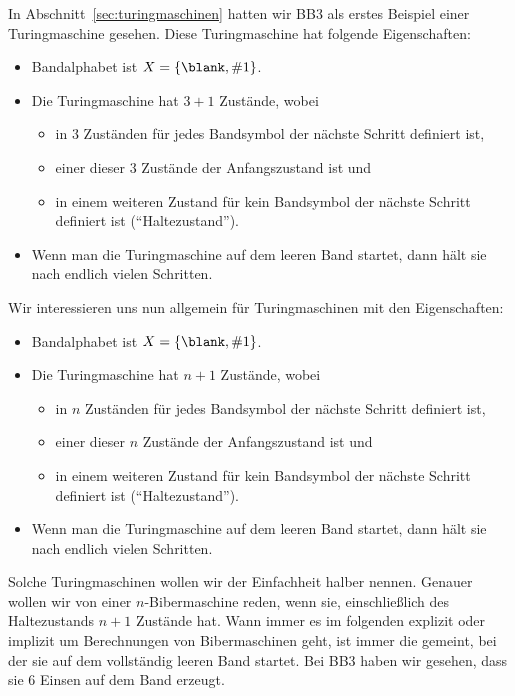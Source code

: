 In Abschnitt~\ref{sec:turingmaschinen} hatten wir BB3 als erstes
Beispiel einer Turingmaschine gesehen. Diese Turingmaschine hat
folgende Eigenschaften:
%
\begin{itemize}
\item Bandalphabet ist $X=\{\blank,\#1\}$.
\item Die Turingmaschine hat $3+1$ Zustände, wobei
  \begin{itemize}
  \item in $3$ Zuständen für jedes Bandsymbol der nächste Schritt
    definiert ist,
  \item einer dieser $3$ Zustände der Anfangszustand ist und
  \item in einem weiteren Zustand für kein Bandsymbol der nächste
    Schritt definiert ist ("`Haltezustand"').
  \end{itemize}
\item Wenn man die Turingmaschine auf dem leeren Band startet, dann
  hält sie nach endlich vielen Schritten.
\end{itemize}
%
Wir interessieren uns nun allgemein für Turingmaschinen mit den
Eigenschaften:
%
\begin{itemize}
\item Bandalphabet ist $X=\{\blank,\#1\}$.
\item Die Turingmaschine hat $n+1$ Zustände, wobei
  \begin{itemize}
  \item in $n$ Zuständen für jedes Bandsymbol der nächste Schritt
    definiert ist,
  \item einer dieser $n$ Zustände der Anfangszustand ist und
  \item in einem weiteren Zustand für kein Bandsymbol der nächste
    Schritt definiert ist ("`Haltezustand"').
  \end{itemize}
\item Wenn man die Turingmaschine auf dem leeren Band startet, dann
  hält sie nach endlich vielen Schritten.
\end{itemize}
%
Solche Turingmaschinen wollen wir der Einfachheit halber
nennen. Genauer wollen wir von einer $n$-Bibermaschine reden, wenn
sie, einschließlich des Haltezustands $n+1$ Zustände hat. Wann immer
es im folgenden explizit oder implizit um Berechnungen von
Bibermaschinen geht, ist immer die gemeint, bei der sie auf dem
vollständig leeren Band startet.  Bei BB3 haben wir gesehen, dass sie
$6$ Einsen auf dem Band erzeugt.

